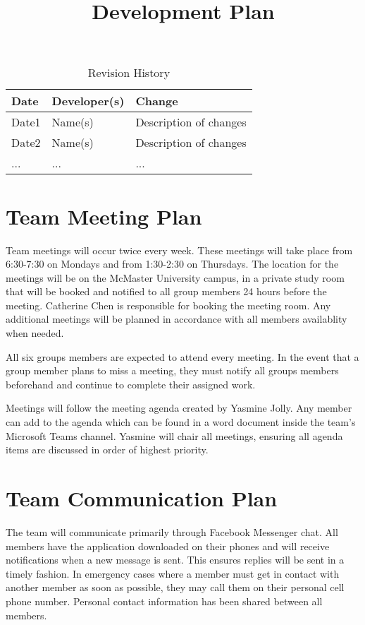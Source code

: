 \documentclass{article}
\title{Development Plan\\\progname}
\author{\authname}
\date{}
\begin{document}
\begin{table}[hp]
\caption{Revision History} \label{TblRevisionHistory}
\begin{tabularx}{\textwidth}{llX}
\toprule
\textbf{Date} & \textbf{Developer(s)} & \textbf{Change}\\
\midrule
Date1 & Name(s) & Description of changes\\
Date2 & Name(s) & Description of changes\\
... & ... & ...\\
\bottomrule
\end{tabularx}
\end{table}

\newpage

\maketitle


\section{Team Meeting Plan}

Team meetings will occur twice every week. These meetings will take place from 6:30-7:30 on Mondays and from 1:30-2:30 on Thursdays. The location for the meetings will be on the McMaster University campus, in a private study room that will be booked and notified to all group members 24 hours before the meeting. Catherine Chen is responsible for booking the meeting room. Any additional meetings will be planned in accordance with all members availablity when needed.

All six groups members are expected to attend every meeting. In the event that a group member plans to miss a meeting, they must notify all groups members beforehand and continue to complete their assigned work.

Meetings will follow the meeting agenda created by Yasmine Jolly. Any member can add to the agenda which can be found in a word document inside the team's Microsoft Teams channel. Yasmine will chair all meetings, ensuring all agenda items are discussed in order of highest priority.

\section{Team Communication Plan}

The team will communicate primarily through Facebook Messenger chat. All members have the application downloaded on their phones and will receive notifications when a new message is sent. This ensures replies will be sent in a timely fashion. In emergency cases where a member must get in contact with another member as soon as possible, they may call them on their personal cell phone number. Personal contact information has been shared between all members.
\end{document}
